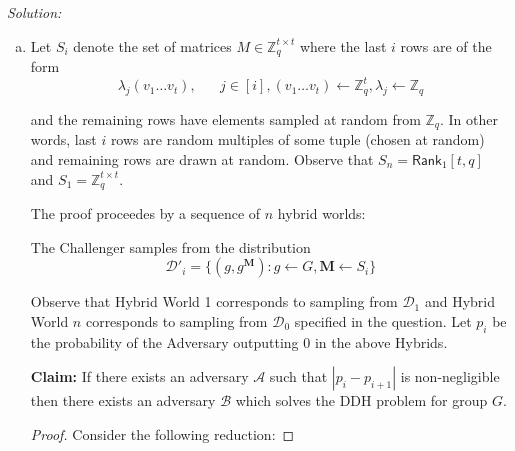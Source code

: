 \documentclass[a4paper, 11pt]{article}
\newenvironment{solution}
    {\textit{Solution:}}
    {\clearpage}
\newcommand{\Z}{\mathbb{Z}}
\newcommand{\calA}{\mathcal{A}}
\newcommand{\calB}{\mathcal{B}}
\newcommand{\calD}{\mathcal{D}}
\begin{document}
\begin{solution}
\begin{enumerate}[(a)]
        \item Let $S_i$ denote the set of matrices $M\in\Z_q^{t\times t}$ where the last $i$ rows are of the form
              $$\lambda_j (v_1 \dots v_t),\hspace{20pt} j\in[i], (v_1 \dots v_t)\gets\Z_q^t, \lambda_j\gets\Z_q$$

              and the remaining rows have elements sampled at random from $\Z_q$. In other words, last $i$ rows are random multiples of some tuple (chosen at random) and remaining rows are drawn at random. Observe that $S_n=\mathsf{Rank}_1[t,q]$ and $S_1=\Z_q^{t\times t}$.

              The proof proceedes by a sequence of $n$ hybrid worlds:
              \begin{world}
                  The Challenger samples from the distribution $$\calD'_i=\{(g,g^\mathbf{M}): g\gets G,\mathbf{M}\gets S_i \}$$
              \end{world}
              Observe that Hybrid World 1 corresponds to sampling from $\calD_1$ and Hybrid World $n$ corresponds to sampling from  $\calD_0$ specified in the question.
              Let $p_i$ be the probability of the Adversary outputting 0 in the above Hybrids.

              \textbf{Claim:} If there exists an adversary $\calA$ such that $|p_i-p_{i+1}|$ is non-negligible then there exists an adversary $\calB$ which solves the DDH problem for group $G$.

              \begin{proof}
                  Consider the following reduction:



\end{proof}
\end{enumerate}
\end{solution}
\end{document}

